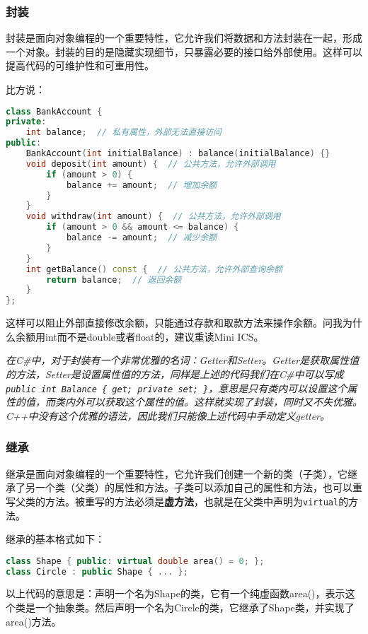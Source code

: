 \documentclass[../main.tex]{subfiles}
\begin{document}
\subsubsection{封装}

封装是面向对象编程的一个重要特性，它允许我们将数据和方法封装在一起，形成一个对象。封装的目的是隐藏实现细节，只暴露必要的接口给外部使用。这样可以提高代码的可维护性和可重用性。

比方说：
\begin{lstlisting}[language=C++]
class BankAccount {
private:
    int balance;  // 私有属性，外部无法直接访问
public:
    BankAccount(int initialBalance) : balance(initialBalance) {}
    void deposit(int amount) {  // 公共方法，允许外部调用
        if (amount > 0) {
            balance += amount;  // 增加余额
        }
    }
    void withdraw(int amount) {  // 公共方法，允许外部调用
        if (amount > 0 && amount <= balance) {
            balance -= amount;  // 减少余额
        }
    }
    int getBalance() const {  // 公共方法，允许外部查询余额
        return balance;  // 返回余额
    }
};
\end{lstlisting}
这样可以阻止外部直接修改余额，只能通过存款和取款方法来操作余额。问我为什么余额用int而不是double或者float的，建议重读Mini ICS。

\emph{
  在C\#中，对于封装有一个非常优雅的名词：Getter和Setter。Getter是获取属性值的方法，Setter是设置属性值的方法，同样是上述的代码我们在C\#中可以写成\texttt{public int Balance \{ get; private set; \}}，意思是只有类内可以设置这个属性的值，而类内外可以获取这个属性的值。这样就实现了封装，同时又不失优雅。C++中没有这个优雅的语法，因此我们只能像上述代码中手动定义getter。
}

\subsubsection{继承}

继承是面向对象编程的一个重要特性，它允许我们创建一个新的类（子类），它继承了另一个类（父类）的属性和方法。子类可以添加自己的属性和方法，也可以重写父类的方法。被重写的方法必须是\textbf{虚方法}，也就是在父类中声明为\texttt{virtual}的方法。

继承的基本格式如下：
\begin{lstlisting}[language=C++]
class Shape { public: virtual double area() = 0; };
class Circle : public Shape { ... };
\end{lstlisting}
以上代码的意思是：声明一个名为Shape的类，它有一个纯虚函数area()，表示这个类是一个抽象类。然后声明一个名为Circle的类，它继承了Shape类，并实现了area()方法。
\end{document}

